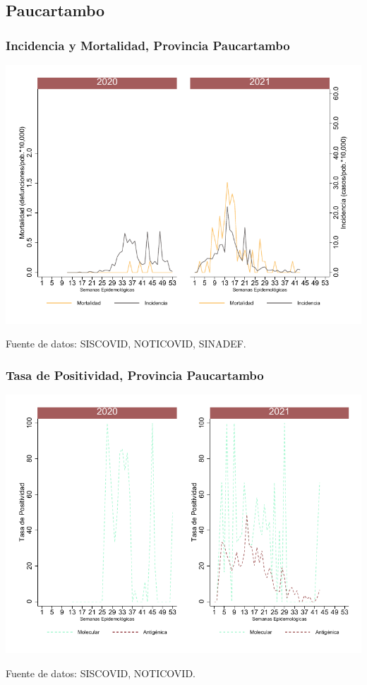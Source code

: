 \documentclass[xcolor=table]{beamer}
\begin{document}
\subsection{Paucartambo}

\begin{frame}[label=Paucartambo]
	\frametitle{Incidencia y Mortalidad, Provincia Paucartambo}
	\vspace{-.5cm}
	\begin{center}
		\includegraphics[width=0.8\linewidth, trim={0cm .5cm 0cm 0.2cm},clip]{../figuras/incidencia_mortalidad_20_21_11.pdf}
	\end{center}
	{\tiny Fuente de datos: SISCOVID, NOTICOVID, SINADEF.}
\end{frame}

\begin{frame}
	\frametitle{Tasa de Positividad, Provincia Paucartambo}
	\vspace{-.5cm}
	\begin{center}
		\includegraphics[width=0.8\linewidth, trim={0cm .5cm 0cm 0.2cm},clip]{../figuras/positividad_20_21_11.pdf}
	\end{center}
	{\tiny Fuente de datos: SISCOVID, NOTICOVID.}
\end{frame}
\end{document}
